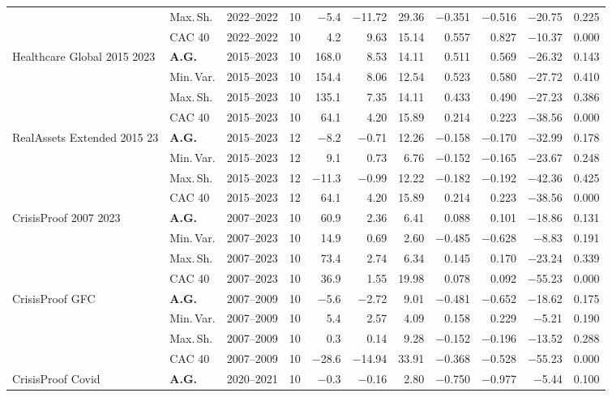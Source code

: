 \begin{longtable}{p{2.6cm} l c c r r r r r r r}
 & Max.\,Sh. & 2022--2022 & 10 & $-$5.4 & $-$11.72 & 29.36 & $-$0.351 & $-$0.516 & $-$20.75 & 0.225 \\
 & CAC 40 & 2022--2022 & 10 & 4.2 & 9.63 & 15.14 & 0.557 & 0.827 & $-$10.37 & 0.000 \\
\midrule
Healthcare Global 2015 2023 & \textbf{A.G.} & 2015--2023 & 10 & 168.0 & 8.53 & 14.11 & 0.511 & 0.569 & $-$26.32 & 0.143 \\
 & Min.\,Var. & 2015--2023 & 10 & 154.4 & 8.06 & 12.54 & 0.523 & 0.580 & $-$27.72 & 0.410 \\
 & Max.\,Sh. & 2015--2023 & 10 & 135.1 & 7.35 & 14.11 & 0.433 & 0.490 & $-$27.23 & 0.386 \\
 & CAC 40 & 2015--2023 & 10 & 64.1 & 4.20 & 15.89 & 0.214 & 0.223 & $-$38.56 & 0.000 \\
\midrule
RealAssets Extended 2015 23 & \textbf{A.G.} & 2015--2023 & 12 & $-$8.2 & $-$0.71 & 12.26 & $-$0.158 & $-$0.170 & $-$32.99 & 0.178 \\
 & Min.\,Var. & 2015--2023 & 12 & 9.1 & 0.73 & 6.76 & $-$0.152 & $-$0.165 & $-$23.67 & 0.248 \\
 & Max.\,Sh. & 2015--2023 & 12 & $-$11.3 & $-$0.99 & 12.22 & $-$0.182 & $-$0.192 & $-$42.36 & 0.425 \\
 & CAC 40 & 2015--2023 & 12 & 64.1 & 4.20 & 15.89 & 0.214 & 0.223 & $-$38.56 & 0.000 \\
\midrule
CrisisProof 2007 2023 & \textbf{A.G.} & 2007--2023 & 10 & 60.9 & 2.36 & 6.41 & 0.088 & 0.101 & $-$18.86 & 0.131 \\
 & Min.\,Var. & 2007--2023 & 10 & 14.9 & 0.69 & 2.60 & $-$0.485 & $-$0.628 & $-$8.83 & 0.191 \\
 & Max.\,Sh. & 2007--2023 & 10 & 73.4 & 2.74 & 6.34 & 0.145 & 0.170 & $-$23.24 & 0.339 \\
 & CAC 40 & 2007--2023 & 10 & 36.9 & 1.55 & 19.98 & 0.078 & 0.092 & $-$55.23 & 0.000 \\
\midrule
CrisisProof GFC & \textbf{A.G.} & 2007--2009 & 10 & $-$5.6 & $-$2.72 & 9.01 & $-$0.481 & $-$0.652 & $-$18.62 & 0.175 \\
 & Min.\,Var. & 2007--2009 & 10 & 5.4 & 2.57 & 4.09 & 0.158 & 0.229 & $-$5.21 & 0.190 \\
 & Max.\,Sh. & 2007--2009 & 10 & 0.3 & 0.14 & 9.28 & $-$0.152 & $-$0.196 & $-$13.52 & 0.288 \\
 & CAC 40 & 2007--2009 & 10 & $-$28.6 & $-$14.94 & 33.91 & $-$0.368 & $-$0.528 & $-$55.23 & 0.000 \\
\midrule
CrisisProof Covid & \textbf{A.G.} & 2020--2021 & 10 & $-$0.3 & $-$0.16 & 2.80 & $-$0.750 & $-$0.977 & $-$5.44 & 0.100 \\

\end{longtable}
